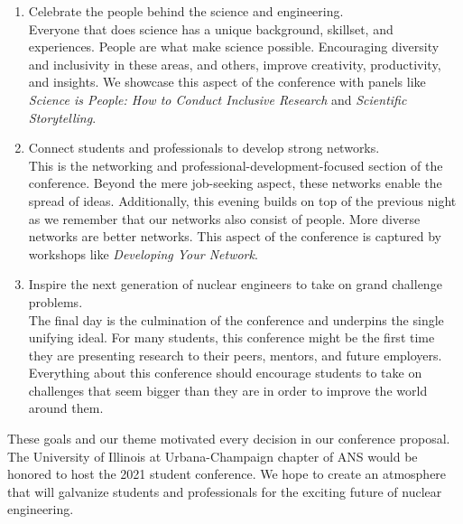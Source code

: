 \begin{enumerate}
	\item Celebrate the people behind the science and engineering.\\
	Everyone that does science has a unique background, skillset, and experiences. People are what make science possible. Encouraging diversity and inclusivity in these areas, and others, improve creativity, productivity, and insights. We showcase this aspect of the conference with panels like \textit{Science is People: How to Conduct Inclusive Research} and \textit{Scientific Storytelling}.
	\item Connect students and professionals to develop strong networks.\\
	This is the networking and professional-development-focused section of the conference. Beyond the mere job-seeking aspect, these networks enable the spread of ideas. Additionally, this evening builds on top of the previous night as we remember that our networks also consist of people. More diverse networks are better networks. This aspect of the conference is captured by workshops like \textit{Developing Your Network}. 
	\item Inspire the next generation of nuclear engineers to take on grand challenge problems.\\
	The final day is the culmination of the conference and underpins the single unifying ideal. For many students, this conference might be the first time they are presenting research to their peers, mentors, and future employers. Everything about this conference should encourage students to take on challenges that seem bigger than they are in order to improve the world around them.  
\end{enumerate}
These goals and our theme motivated every decision in our conference proposal. The University of Illinois at Urbana-Champaign chapter of ANS would be honored to host the 2021 student conference. We hope to create an atmosphere that will galvanize students and professionals for the exciting future of nuclear engineering.\\
